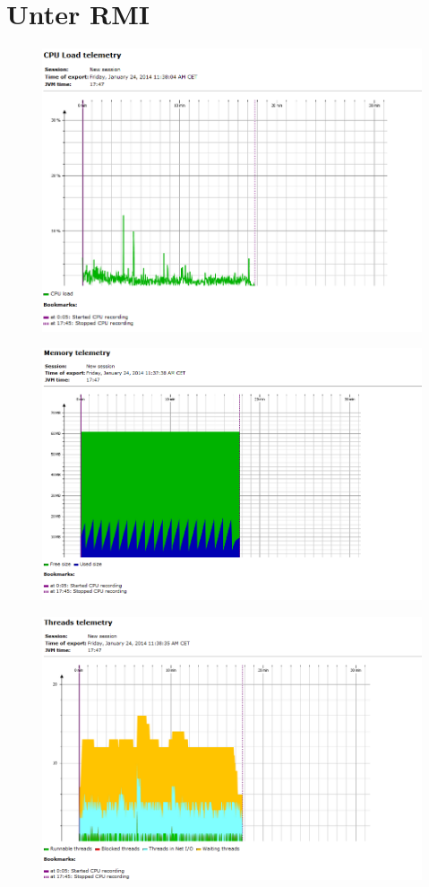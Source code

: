 \documentclass[a4paper,12pt]{scrreprt}
\begin{document}
	\section{Unter RMI}
\begin{figure}[h]
\centering
\includegraphics[width=0.6\linewidth]{./CPU_Load_Telemetry_RMI}
\caption{}
\label{fig:CPU_Load_Telemetry_RMI}
\end{figure}
\begin{figure}[h]
\centering
\includegraphics[width=0.6\linewidth]{./Memory_RMI}
\caption{}
\label{fig:Memory_RMI}
\end{figure}
\begin{figure}[h]
\centering
\includegraphics[width=0.6\linewidth]{./Thread_RMI}
\caption{}
\label{fig:Thread_RMI}
\end{figure}



\pagebreak
\end{document}
